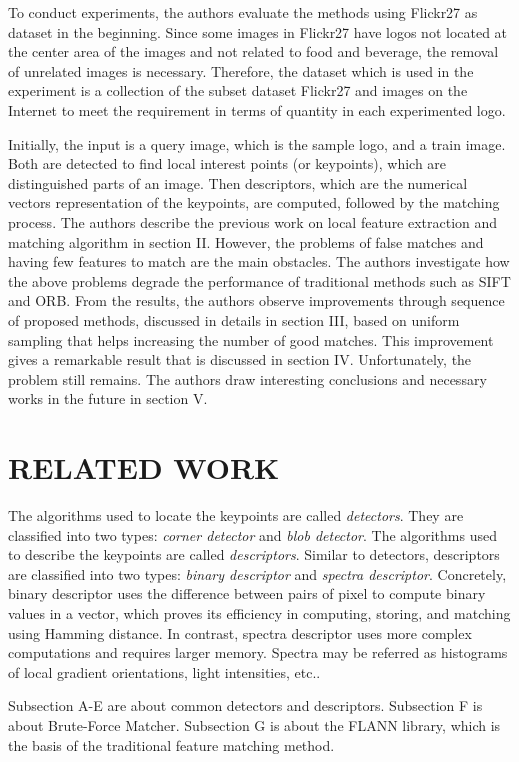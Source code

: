 \documentclass[letterpaper, 10 pt, conference]{ieeeconf}  %
\begin{document}
To conduct experiments, the authors evaluate the methods using Flickr27\cite{619} as dataset in the beginning. Since some images in Flickr27 have logos not located at the center area of the images and not related to food and beverage, the removal of unrelated images is necessary. Therefore, the dataset which is used in the experiment is a collection of the subset dataset Flickr27 and images on the Internet to meet the requirement in terms of quantity in each experimented logo.\par
Initially, the input is a query image, which is the sample logo, and a train image. Both are detected to find local interest points (or keypoints), which are distinguished parts of an image. Then descriptors, which are the numerical vectors representation of the keypoints, are computed, followed by the matching process. The authors describe the previous work on local feature extraction and matching algorithm in section II. However, the problems of false matches and having few features to match are the main obstacles. The authors investigate how the above problems degrade the performance of traditional methods such as SIFT\cite{sift} and ORB\cite{orb}. From the results, the authors observe improvements through sequence of proposed methods, discussed in details in section III, based on uniform sampling that helps increasing the number of good matches. This improvement gives a remarkable result that is discussed in section IV. Unfortunately, the problem still remains. The authors draw interesting conclusions and necessary works in the future in section V.\par
\section{RELATED WORK}
The algorithms used to locate the keypoints are called \textit{detectors}. They are classified into two types: \textit{corner detector} and \textit{blob detector}. The algorithms used to describe the keypoints are called \textit{descriptors}. Similar to detectors, descriptors are classified into two types: \textit{binary descriptor} and \textit{spectra descriptor}\cite{tonghop}. Concretely, binary descriptor uses the difference between pairs of pixel to compute binary values in a vector, which proves its efficiency in computing, storing, and matching using Hamming distance. In contrast, spectra descriptor uses more complex computations and requires larger memory. Spectra may be referred as histograms of local gradient orientations, light intensities, etc.\cite{tonghop}.\par
Subsection A-E are about common detectors and descriptors. Subsection F is about Brute-Force Matcher. Subsection G is about the FLANN library, which is the basis of the traditional feature matching method.
\end{document}
